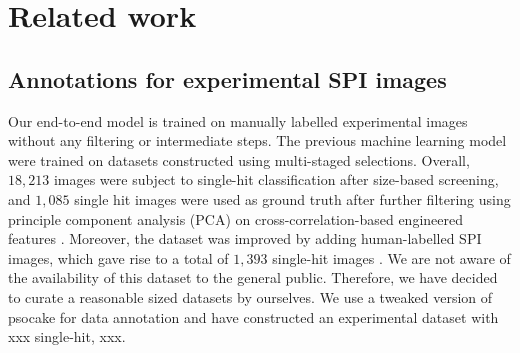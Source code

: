 \section{Related work}



\subsection{Annotations for experimental SPI images}


Our end-to-end model is trained on manually labelled experimental images without
any filtering or intermediate steps.  The previous machine learning model
\cite{ignatenkoClassificationDiffractionPatterns2021} were trained on datasets
constructed using multi-staged selections. Overall, $18,213$ images were subject
to single-hit classification after size-based screening, and $1,085$ single hit
images were used as ground truth after further filtering using principle
component analysis (PCA) on cross-correlation-based engineered features
\cite{roseSingleparticleImagingSymmetry2018}. Moreover, the dataset was improved
by adding human-labelled SPI images, which gave rise to a total of $1,393$
single-hit images \cite{liDiffractionDataAerosolized2020a}.  We are not aware of
the availability of this dataset to the general public.  Therefore, we have
decided to curate a reasonable sized datasets by ourselves. We use a tweaked
version of psocake for data annotation and have constructed an experimental
dataset with {\color{red}xxx} single-hit, {\color{red}xxx}.  


